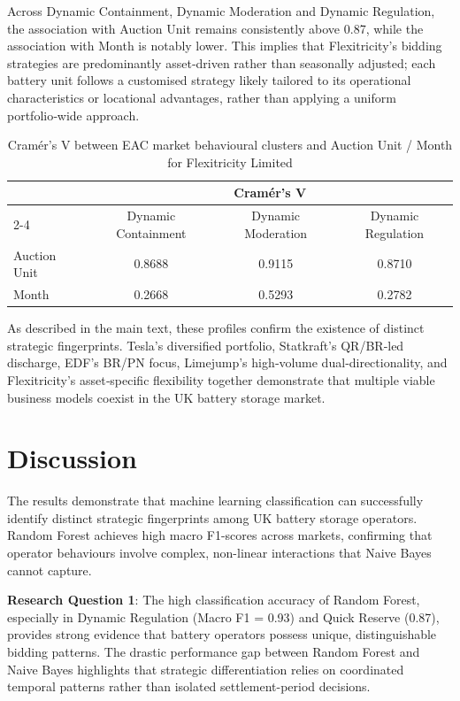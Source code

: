\documentclass[12pt,a4paper]{article}
\begin{document}
  Across Dynamic Containment, Dynamic Moderation and Dynamic Regulation, the association with Auction Unit remains consistently above 0.87, while the association with Month is notably lower. This implies that Flexitricity’s bidding strategies are predominantly asset‑driven rather than seasonally adjusted; each battery unit follows a customised strategy likely tailored to its operational characteristics or locational advantages, rather than applying a uniform portfolio‑wide approach.

\begin{table}[H]
\centering
\caption{Cramér’s V between EAC market behavioural clusters and Auction Unit / Month for Flexitricity Limited}
\label{tab:flex_cramers}
\begin{tabular}{@{}lccc@{}}
\toprule
& \multicolumn{3}{c}{Cramér’s V} \\
\cmidrule(lr){2-4}
& Dynamic Containment & Dynamic Moderation & Dynamic Regulation \\
\midrule
Auction Unit & 0.8688 & 0.9115 & 0.8710 \\
Month        & 0.2668 & 0.5293 & 0.2782 \\
\bottomrule
\end{tabular}
\end{table}

As described in the main text, these profiles confirm the existence of distinct strategic fingerprints. Tesla’s diversified portfolio, Statkraft’s QR/BR‑led discharge, EDF’s BR/PN focus, Limejump’s high‑volume dual‑directionality, and Flexitricity’s asset‑specific flexibility together demonstrate that multiple viable business models coexist in the UK battery storage market.


\section{Discussion}
The results demonstrate that machine learning classification can successfully identify distinct strategic fingerprints among UK battery storage operators. Random Forest achieves high macro F1-scores across markets, confirming that operator behaviours involve complex, non-linear interactions that Naive Bayes cannot capture.

\textbf{Research Question 1}: The high classification accuracy of Random Forest, especially in Dynamic Regulation (Macro F1 = 0.93) and Quick Reserve (0.87), provides strong evidence that battery operators possess unique, distinguishable bidding patterns. The drastic performance gap between Random Forest and Naive Bayes highlights that strategic differentiation relies on coordinated temporal patterns rather than isolated settlement-period decisions.
\end{document}
